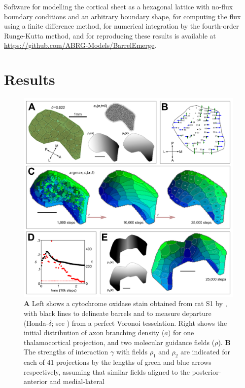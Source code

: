 \documentclass[9pt,lineno]{elife}
\begin{document}
Software for modelling the cortical sheet as a hexagonal lattice with no-flux
boundary conditions and an arbitrary boundary shape, for computing the flux
using a finite difference method, for numerical integration by the
fourth-order Runge-Kutta method, and for reproducing these results is
available at \url{https://github.com/ABRG-Models/BarrelEmerge}.

\section{Results}

\begin{figure}
\begin{fullwidth}
\includegraphics[width=\linewidth]{./MainFig_superlowres.png}
\caption{\textbf{A} Left shows a cytochrome oxidase stain obtained from rat S1
  by \cite{zheng_signal_2001}, with black lines to delineate barrels and to
  measure departure (Honda-$\delta$; see \cite{senft_mouse_1991}) from a
  perfect Voronoi tesselation. Right shows the initial distribution of axon
  branching density ($a$) for one thalamocortical projection, and two
  molecular guidance fields ($\rho$). \textbf{B} The strengths of interaction
  $\gamma$ with fields $\rho_1$ and $\rho_2$ are indicated for each of 41
  projections by the lengths of green and blue arrows respectively, assuming
  that similar fields aligned to the posterior-anterior and medial-lateral
}
\end{fullwidth}
\end{figure}
\end{document}
